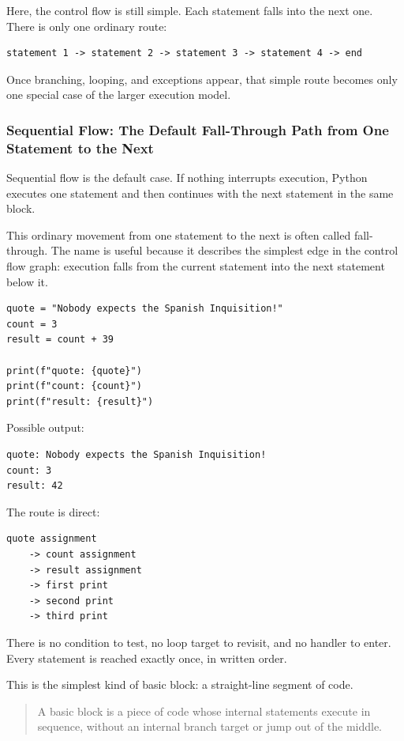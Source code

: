 Here, the control flow is still simple. Each statement falls into the next one. There is only one ordinary route:

\begin{verbatim}
statement 1 -> statement 2 -> statement 3 -> statement 4 -> end
\end{verbatim}

Once branching, looping, and exceptions appear, that simple route becomes only one special case of the larger execution model.

\subsubsection{Sequential Flow: The Default Fall-Through Path from One Statement to the Next}

Sequential flow is the default case. If nothing interrupts execution, Python executes one statement and then continues with the next statement in the same block.

This ordinary movement from one statement to the next is often called fall-through. The name is useful because it describes the simplest edge in the control flow graph: execution falls from the current statement into the next statement below it.

\begin{verbatim}
quote = "Nobody expects the Spanish Inquisition!"
count = 3
result = count + 39

print(f"quote: {quote}")
print(f"count: {count}")
print(f"result: {result}")
\end{verbatim}

Possible output:

\begin{verbatim}
quote: Nobody expects the Spanish Inquisition!
count: 3
result: 42
\end{verbatim}

The route is direct:

\begin{verbatim}
quote assignment
    -> count assignment
    -> result assignment
    -> first print
    -> second print
    -> third print
\end{verbatim}

There is no condition to test, no loop target to revisit, and no handler to enter. Every statement is reached exactly once, in written order.

This is the simplest kind of basic block: a straight-line segment of code.

\begin{quote}
A basic block is a piece of code whose internal statements execute in sequence, without an internal branch target or jump out of the middle.
\end{quote}

